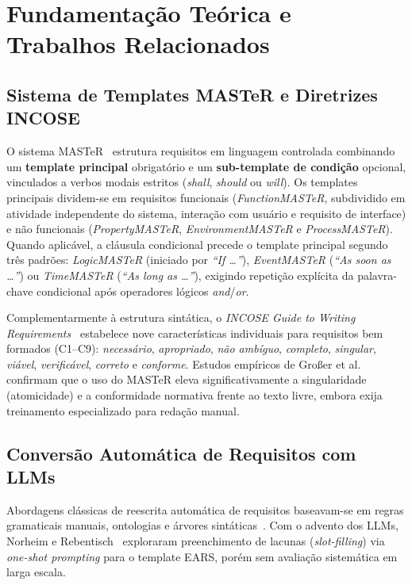 \section{Fundamentação Teórica e Trabalhos Relacionados}

\subsection{Sistema de Templates MASTeR e Diretrizes INCOSE}
O sistema MASTeR~\cite{sophist2020master, rupp2014anforderungsschablonen} estrutura requisitos em linguagem controlada combinando um \textbf{template principal} obrigatório e um \textbf{sub-template de condição} opcional, vinculados a verbos modais estritos (\textit{shall}, \textit{should} ou \textit{will}). Os templates principais dividem-se em requisitos funcionais (\textit{FunctionMASTeR}, subdividido em atividade independente do sistema, interação com usuário e requisito de interface) e não funcionais (\textit{PropertyMASTeR}, \textit{EnvironmentMASTeR} e \textit{ProcessMASTeR}). Quando aplicável, a cláusula condicional precede o template principal segundo três padrões: \textit{LogicMASTeR} (iniciado por \textit{``If \dots''}), \textit{EventMASTeR} (\textit{``As soon as \dots''}) ou \textit{TimeMASTeR} (\textit{``As long as \dots''}), exigindo repetição explícita da palavra-chave condicional após operadores lógicos \textit{and}/\textit{or}.

Complementarmente à estrutura sintática, o \textit{INCOSE Guide to Writing Requirements}~\cite{incose2023guide} estabelece nove características individuais para requisitos bem formados (C1--C9): \textit{necessário}, \textit{apropriado}, \textit{não ambíguo}, \textit{completo}, \textit{singular}, \textit{viável}, \textit{verificável}, \textit{correto} e \textit{conforme}. Estudos empíricos de Gro\ss er et al.~\cite{grosser2023comparative, grosser2024benchmarking} confirmam que o uso do MASTeR eleva significativamente a singularidade (atomicidade) e a conformidade normativa frente ao texto livre, embora exija treinamento especializado para redação manual.

\subsection{Conversão Automática de Requisitos com LLMs}
Abordagens clássicas de reescrita automática de requisitos baseavam-se em regras gramaticais manuais, ontologias e árvores sintáticas~\cite{arora2015automated}. Com o advento dos LLMs, Norheim e Rebentisch~\cite{norheim2024structuring} exploraram preenchimento de lacunas (\textit{slot-filling}) via \textit{one-shot prompting} para o template EARS, porém sem avaliação sistemática em larga escala.

